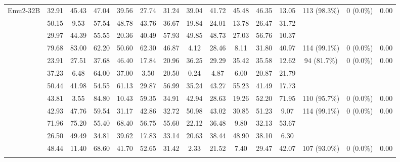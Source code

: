 \documentclass[letterpaper]{article} %
\begin{document}
{\begin{table}[t!]
\begin{tabular}{p{2.2cm} ccccccccccc cc c}
\multirow{2}{*}{Emu2-32B} & 32.91 	&	45.43 	&	47.04 	&	39.56 	&	27.74 	&	31.24 	&	39.04 	&	41.72 	&	45.48 	&	46.35 	&	13.05   & \multirow{2}{*}{113 (98.3\%)} & \multirow{2}{*}{0 (0.0\%)} & \multirow{2}{*}{0.00} \\
& 50.15 	&	9.53 	&	57.54 	&	48.78 	&	43.76 	&	36.67 	&	19.84 	&	24.01 	&	13.78 	&	26.47 	&	31.72  &  &  &   \\
\addlinespace[4pt]


\rowcolor{bg-tb-light-nlp} & 29.97 	&	44.39 	&	55.55 	&	20.36 	&	40.49 	&	57.93 	&	49.85 	&	48.73 	&	27.03 	&	56.76 	&	10.37  &  &  &   \\
\rowcolor{bg-tb-light-nlp} \multirow{-2}{*}{DeepSeek-VL-7B} & 79.68 	&	83.00 	&	62.20 	&	50.60 	&	62.30 	&	46.87 	&	4.12 	&	28.46 	&	8.11 	&	31.80 	&	40.97  & \multirow{-2}{*}{114 (99.1\%)} & \multirow{-2}{*}{0 (0.0\%)} & \multirow{-2}{*}{0.00} \\
\addlinespace[4pt]


\multirow{2}{*}{Qwen2-VL-7B} & 23.91 	&	27.51 	&	37.68 	&	46.40 	&	17.84 	&	20.96 	&	36.25 	&	29.29 	&	35.42 	&	35.58 	&	12.62  & \multirow{2}{*}{94 (81.7\%)} & \multirow{2}{*}{0 (0.0\%)} & \multirow{2}{*}{0.00} \\
& 37.23 	&	6.48 	&	64.00 	&	37.00 	&	3.50 	&	20.50 	&	0.24 	&	4.87 	&	6.00 	&	20.87 	&	21.79  &  &  &  \\
\addlinespace[4pt]


\rowcolor{bg-tb-light-nlp} & 50.44 	&	41.98 	&	54.55 	&	61.13 	&	29.87 	&	56.99 	&	35.24 	&	43.27 	&	55.23 	&	41.49 	&	17.73  & &  & \\
\rowcolor{bg-tb-light-nlp} \multirow{-2}{*}{\parbox{2cm}{LLaVA-One-Vision-72B}} & 43.81 	&	3.55 	&	84.80 	&	10.43 	&	59.35 	&	34.91 	&	42.94 	&	28.63 	&	19.26 	&	52.20 	&	71.95  &  \multirow{-2}{*}{110 (95.7\%)} & \multirow{-2}{*}{0 (0.0\%)} & \multirow{-2}{*}{0.00} \\
\addlinespace[4pt]


\multirow{2}{*}{InternVL2.5-8B} & 42.93 	&	47.76 	&	59.54 	&	31.17 	&	42.86 	&	32.72 	&	50.98 	&	43.02 	&	30.85 	&	51.23 	&	9.07  & \multirow{2}{*}{114 (99.1\%)} & \multirow{2}{*}{0 (0.0\%)} & \multirow{2}{*}{0.00}  \\
 & 71.96 	&	75.20 	&	55.40 	&	68.40 	&	56.75 	&	55.60 	&	22.12 	&	36.48 	&	9.80 	&	32.13 	&	53.67  &  &  &  \\
\addlinespace[4pt]

\rowcolor{bg-tb-light-nlp} & 26.50 	&	49.49 	&	34.81 	&	39.62 	&	17.83 	&	33.14 	&	20.63 	&	38.44 	&	48.90 	&	38.10 	&	6.30  &   &  &  \\
\rowcolor{bg-tb-light-nlp} \multirow{-2}{*}{Long-llava} & 48.44 	&	11.40 	&	68.60 	&	41.70 	&	52.65 	&	31.42 	&	2.33 	&	21.52 	&	7.40 	&	29.47 	&	42.07  &\multirow{-2}{*}{107 (93.0\%)} & \multirow{-2}{*}{0 (0.0\%)} & \multirow{-2}{*}{0.00}  \\
\addlinespace[4pt]


\end{tabular}
\end{table}}
\end{document}
